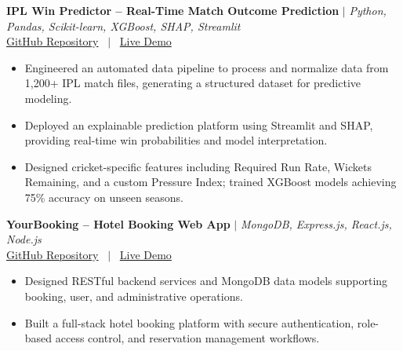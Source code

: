 \documentclass[10pt, a4paper]{article}
\begin{document}
\textbf{IPL Win Predictor -- Real-Time Match Outcome Prediction} $|$ \textit{Python, Pandas, Scikit-learn, XGBoost, SHAP, Streamlit} \\

\small{
\href{https://github.com/PankajKumar-11/IPL-Win-Predictor}{GitHub Repository}
 \ $|$ \ \href{https://demo.example.com}{Live Demo}
} \\

\begin{itemize}

    \item Engineered an automated data pipeline to process and normalize data from 1,200+ IPL match files, generating a structured dataset for predictive modeling.

    \item Deployed an explainable prediction platform using Streamlit and SHAP, providing real-time win probabilities and model interpretation.

    \item Designed cricket-specific features including Required Run Rate, Wickets Remaining, and a custom Pressure Index; trained XGBoost models achieving 75\% accuracy on unseen seasons.

\end{itemize}
\vspace{2pt}

\textbf{YourBooking -- Hotel Booking Web App} $|$ \textit{MongoDB, Express.js, React.js, Node.js} \\

\small{
\href{https://github.com/PankajKumar-11/YourBooking}{GitHub Repository}
 \ $|$ \ \href{https://demo.example.com}{Live Demo}
} \\

\begin{itemize}

    \item Designed RESTful backend services and MongoDB data models supporting booking, user, and administrative operations.

    \item Built a full-stack hotel booking platform with secure authentication, role-based access control, and reservation management workflows.

\end{itemize}
\vspace{2pt}


\end{document}

